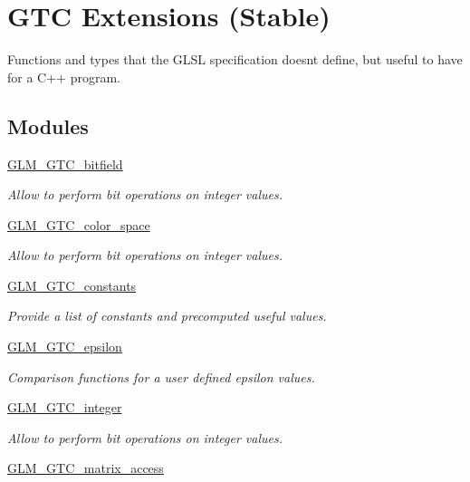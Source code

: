 \hypertarget{group__gtc}{}\section{G\+T\+C Extensions (Stable)}
\label{group__gtc}


Functions and types that the G\+L\+S\+L specification doesn\textquotesingle{}t define, but useful to have for a C++ program.  


\subsection*{Modules}
\begin{DoxyCompactItemize}
\item 
\hyperlink{group__gtc__bitfield}{G\+L\+M\+\_\+\+G\+T\+C\+\_\+bitfield}
\begin{DoxyCompactList}\small\item\em Allow to perform bit operations on integer values. \end{DoxyCompactList}\item 
\hyperlink{group__gtc__color__space}{G\+L\+M\+\_\+\+G\+T\+C\+\_\+color\+\_\+space}
\begin{DoxyCompactList}\small\item\em Allow to perform bit operations on integer values. \end{DoxyCompactList}\item 
\hyperlink{group__gtc__constants}{G\+L\+M\+\_\+\+G\+T\+C\+\_\+constants}
\begin{DoxyCompactList}\small\item\em Provide a list of constants and precomputed useful values. \end{DoxyCompactList}\item 
\hyperlink{group__gtc__epsilon}{G\+L\+M\+\_\+\+G\+T\+C\+\_\+epsilon}
\begin{DoxyCompactList}\small\item\em Comparison functions for a user defined epsilon values. \end{DoxyCompactList}\item 
\hyperlink{group__gtc__integer}{G\+L\+M\+\_\+\+G\+T\+C\+\_\+integer}
\begin{DoxyCompactList}\small\item\em Allow to perform bit operations on integer values. \end{DoxyCompactList}\item 
\hyperlink{group__gtc__matrix__access}{G\+L\+M\+\_\+\+G\+T\+C\+\_\+matrix\+\_\+access}

\end{DoxyCompactItemize}
